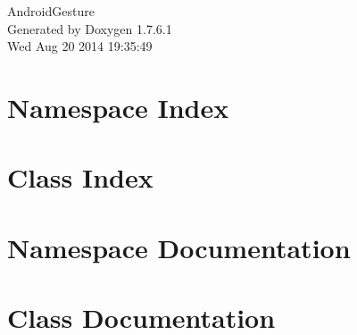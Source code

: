 \documentclass[a4paper]{book}
\begin{document}
\hypersetup{pageanchor=false,citecolor=blue}
\begin{titlepage}
\vspace*{7cm}
\begin{center}
{\Large \-Android\-Gesture }\\
\vspace*{1cm}
{\large \-Generated by Doxygen 1.7.6.1}\\
\vspace*{0.5cm}
{\small Wed Aug 20 2014 19:35:49}\\
\end{center}
\end{titlepage}
\clearemptydoublepage
{}
\tableofcontents
\clearemptydoublepage
{}
\hypersetup{pageanchor=true,citecolor=blue}
\chapter{\-Namespace \-Index}

\chapter{\-Class \-Index}

\chapter{\-Namespace \-Documentation}

\chapter{\-Class \-Documentation}








\printindex
\end{document}
